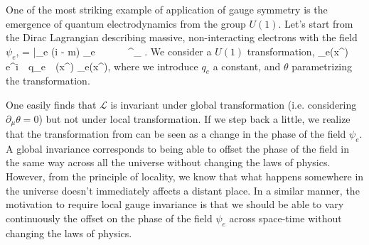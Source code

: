     One of the most striking example of application of gauge symmetry is the emergence of
    quantum electrodynamics from the group $U(1)$. Let's start from the Dirac Lagrangian
    describing massive, non-interacting electrons with the field $\psi_e$,
    {
        =
        \bar{\psi_e} (i \dslash - m) \psi_e
        \,\,\,\,\,\,\,
        \,\,\,\,\,\,\,
        \dslash {} \gamma^\mu \partial_\mu
        .
    }
    We consider a $U(1)$ transformation,
    {
        \psi_e(x^\mu)
        \rightarrow
        e^{i \,\cdot\, q_e \,\cdot\, \theta(x^\mu)} \psi_e(x^\mu),
    }
    where we introduce $q_e$ a constant, and $\theta$ parametrizing the transformation.

    One easily finds that $\mathcal{L}$ is invariant under global transformation (i.e.
    considering $\partial_\mu \theta = 0$) but not under local transformation.
    If we step back a little, we realize that the transformation from 
    can be seen as a change in the phase of the field $\psi_e$. A global invariance
    corresponds to being able to offset the phase of the field in the same way across all
    the universe without changing the laws of physics. However, from the principle of
    locality, we know that what happens somewhere in the universe doesn't immediately affects
    a distant place. In a similar manner, the motivation to require local gauge invariance
    is that we should be able to vary continuously the offset on the phase of the
    field $\psi_e$ across space-time without changing the laws of physics.

